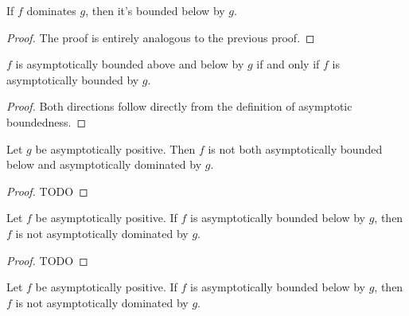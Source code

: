 \begin{lemma}
    \label{lemma:asymp_left_dom_imp_bounded_below}
    \leanok
    If $f$ dominates $g$, then it's bounded below by $g$.
\end{lemma}

\begin{proof}
    \leanok
    The proof is entirely analogous to the previous proof.
\end{proof}

\begin{theorem}
    \label{thm:asymp_bounded_above_below_iff}
    \leanok
    $f$ is asymptotically bounded above and below by $g$ if and only if $f$ is 
    asymptotically bounded by $g$.
\end{theorem}

\begin{proof}
    \leanok
    Both directions follow directly from the definition of asymptotic boundedness. 
\end{proof}

\begin{lemma}
    \label{lemma:not_asymp_pos_bounded_below_and_right_dom}
    \leanok
    Let $g$ be asymptotically positive. Then $f$ is not both asymptotically bounded 
    below and asymptotically dominated by $g$.
\end{lemma}

\begin{proof}
    \leanok
    TODO
\end{proof}

\begin{theorem}
    \label{thm:asymp_pos_bounded_below_imp_not_right_dom}
    \leanok
    Let $f$ be asymptotically positive. If $f$ is asymptotically bounded below by $g$, 
    then $f$ is not asymptotically dominated by $g$.
\end{theorem}

\begin{proof}
    \leanok
    TODO 
\end{proof}

\begin{theorem}
    \label{thm:asymp_pos_right_dom_imp_not_bounded_below}
    \leanok
    Let $f$ be asymptotically positive. If $f$ is asymptotically bounded below by $g$, 
    then $f$ is not asymptotically dominated by $g$.
\end{theorem}

